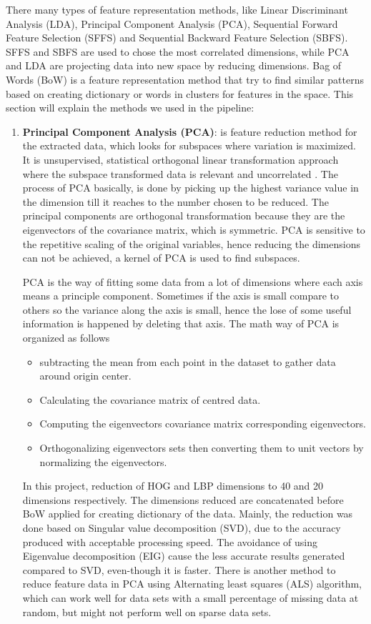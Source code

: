 There many types of feature representation methods, like Linear Discriminant Analysis (LDA), Principal Component Analysis (PCA), Sequential Forward Feature Selection (SFFS) and Sequential Backward Feature Selection (SBFS).
SFFS and SBFS are used to chose the most correlated dimensions, while PCA and LDA are projecting data into new space by reducing dimensions.
Bag of Words (BoW) is a feature representation method that try to find similar patterns based on creating dictionary or words in clusters for features in the space.
This section will explain the methods we used in the pipeline:
\begin{enumerate}
\item \textbf{Principal Component Analysis (PCA)}: is feature reduction method for the extracted data, which looks for subspaces where variation is maximized.
It is unsupervised, statistical orthogonal linear transformation approach where the subspace transformed data is relevant and uncorrelated .
The process of PCA basically, is done by picking up the highest variance value in the dimension till it reaches to the number chosen to be reduced.
The principal components are orthogonal transformation because they are the eigenvectors of the covariance matrix, which is symmetric.
PCA is sensitive to the repetitive scaling of the original variables, hence reducing the dimensions can not be achieved, a kernel of PCA is used to find subspaces.

PCA is the way of fitting some data from a lot of dimensions where each axis means a principle component.
Sometimes if the axis is small compare to others so the variance along the axis is small, hence the lose of some useful information is happened by deleting that axis. 
The math way of PCA is organized as follows
\begin{itemize}
\item subtracting the mean from each point in the dataset to gather data around origin center.
\item Calculating the covariance matrix of centred data.
\item Computing the eigenvectors covariance matrix corresponding eigenvectors.
\item Orthogonalizing eigenvectors sets then converting them to unit vectors by normalizing the eigenvectors.
\end{itemize}

In this project, reduction of HOG and LBP dimensions to 40 and 20 dimensions respectively.
The dimensions reduced are concatenated before BoW applied for creating dictionary of the data.
Mainly, the reduction was done based on Singular value decomposition (SVD), due to the accuracy produced with acceptable processing speed.
The avoidance of using Eigenvalue decomposition (EIG) cause the less accurate results generated compared to SVD, even-though it is faster.
There is another method to reduce feature data in PCA using Alternating least squares (ALS) algorithm, which can work well for data sets with a small percentage of missing data at random, but might not perform well on sparse data sets\cite{jackson2005user}.


\end{enumerate}
